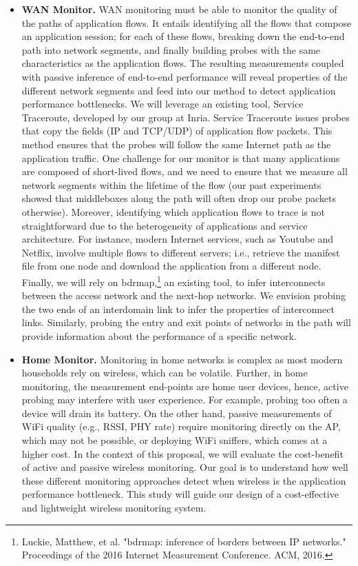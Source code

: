 \documentclass[11 pt]{article}
\begin{document}
\begin{itemize}
\item \textbf{WAN Monitor.} WAN monitoring must be able to monitor the quality of the paths of application flows. It entails identifying all the flows that compose an application session; for each of these flows, breaking down the end-to-end path into network segments, and finally building probes with the same characteristics as the application flows. The resulting measurements coupled with passive inference of end-to-end performance will reveal properties of the different network segments and feed into our method to detect application performance bottlenecks. We will leverage an existing tool, Service Traceroute, developed by our group at Inria. Service Traceroute issues probes that copy the fields (IP and TCP/UDP) of application flow packets. This method ensures that the probes will follow the same Internet path as the application traffic. One challenge for our monitor is that many applications are composed of short-lived flows, and we need to ensure that we measure all network segments within the lifetime of the flow (our past experiments showed that middleboxes along the path will often drop our probe packets otherwise). Moreover, identifying which application flows to trace is not straightforward due to the heterogeneity of applications and service architecture. For instance, modern Internet services, such as Youtube and Netflix, involve multiple flows to different servers; i.e., retrieve the manifest file from one node and download the application from a different node. Finally, we will rely on bdrmap,\footnote{Luckie, Matthew, et al. "bdrmap: inference of borders between IP networks." Proceedings of the 2016 Internet Measurement Conference. ACM, 2016.} an existing tool, to infer interconnects between the access network and the next-hop networks. We envision probing the two ends of an interdomain link to infer the properties of interconnect links. Similarly, probing the entry and exit points of networks in the path will provide information about the performance of a specific network.

\item \textbf{Home Monitor.} Monitoring in home networks is complex as most modern households rely on wireless, which can be volatile. Further, in home monitoring, the measurement end-points are home user devices, hence, active probing may interfere with user experience. For example, probing too often a device will drain its battery. On the other hand, passive measurements of WiFi quality (e.g., RSSI, PHY rate) require monitoring directly on the AP, which may not be possible, or deploying WiFi sniffers, which comes at a higher cost. In the context of this proposal, we will evaluate the cost-benefit of active and passive wireless monitoring. Our goal is to understand how well these different monitoring approaches detect when wireless is the application performance bottleneck. This study will guide our design of a cost-effective and lightweight wireless monitoring system.


\end{itemize}
\end{document}
